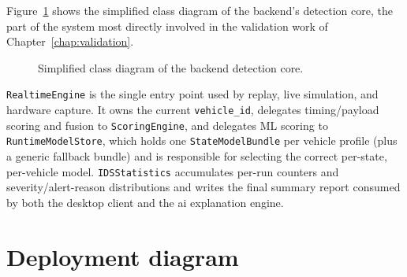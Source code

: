 Figure~\ref{fig:class-diagram} shows the simplified class diagram of the backend's detection core, the part of the system most directly involved in the validation work of Chapter~\ref{chap:validation}.

\begin{figure}[H]
\centering
{}
\caption{Simplified class diagram of the backend detection core.}
\label{fig:class-diagram}
\end{figure}

\texttt{RealtimeEngine} is the single entry point used by replay, live simulation, and hardware capture. It owns the current \texttt{vehicle\_id}, delegates timing/payload scoring and fusion to \texttt{ScoringEngine}, and delegates ML scoring to \texttt{RuntimeModelStore}, which holds one \texttt{StateModelBundle} per vehicle profile (plus a generic fallback bundle) and is responsible for selecting the correct per-state, per-vehicle model. \texttt{IDSStatistics} accumulates per-run counters and severity/alert-reason distributions and writes the final summary report consumed by both the desktop client and the \gls{ai} explanation engine.

\section{Deployment diagram}


